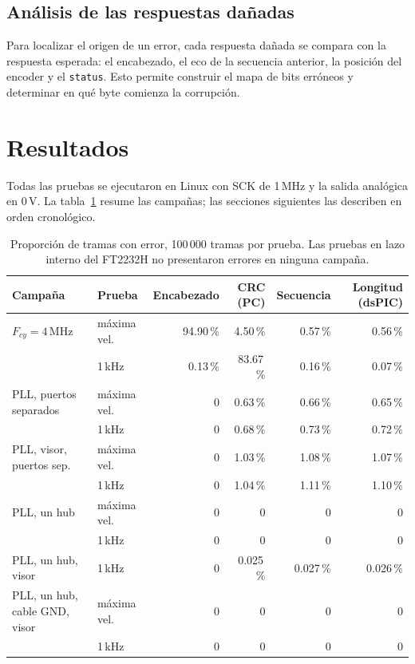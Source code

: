 \documentclass[11pt]{article}
\newcommand{\code}[1]{\texttt{#1}}
\begin{document}
\subsection{Análisis de las respuestas dañadas}

Para localizar el origen de un error, cada respuesta dañada se compara con la
respuesta esperada: el encabezado, el eco de la secuencia anterior, la
posición del encoder y el \code{status}. Esto permite construir el mapa de
bits erróneos y determinar en qué byte comienza la corrupción.

\section{Resultados}

Todas las pruebas se ejecutaron en Linux con SCK de 1\,MHz y la salida
analógica en 0\,V. La tabla~\ref{tab:campanas} resume las campañas; las
secciones siguientes las describen en orden cronológico.

\begin{table}[H]
\centering
\small
\begin{tabular}{@{}llrrrr@{}}
\toprule
Campaña & Prueba & Encabezado & CRC (PC) & Secuencia & Longitud (dsPIC) \\
\midrule
$F_{cy} = 4$\,MHz & máxima vel. & 94.90\,\% & 4.50\,\% & 0.57\,\% & 0.56\,\% \\
                  & 1\,kHz      & 0.13\,\%  & 83.67\,\% & 0.16\,\% & 0.07\,\% \\
\addlinespace
PLL, puertos separados & máxima vel. & 0 & 0.63\,\% & 0.66\,\% & 0.65\,\% \\
                       & 1\,kHz      & 0 & 0.68\,\% & 0.73\,\% & 0.72\,\% \\
\addlinespace
PLL, visor, puertos sep. & máxima vel. & 0 & 1.03\,\% & 1.08\,\% & 1.07\,\% \\
                         & 1\,kHz      & 0 & 1.04\,\% & 1.11\,\% & 1.10\,\% \\
\addlinespace
PLL, un hub             & máxima vel. & 0 & 0 & 0 & 0 \\
                        & 1\,kHz      & 0 & 0 & 0 & 0 \\
PLL, un hub, visor      & 1\,kHz      & 0 & 0.025\,\% & 0.027\,\% & 0.026\,\% \\
\addlinespace
PLL, un hub, cable GND, visor & máxima vel. & 0 & 0 & 0 & 0 \\
                              & 1\,kHz      & 0 & 0 & 0 & 0 \\
\bottomrule
\end{tabular}
\caption{Proporción de tramas con error, 100\,000 tramas por prueba. Las
pruebas en lazo interno del FT2232H no presentaron errores en ninguna
campaña.}
\label{tab:campanas}
\end{table}
\end{document}
